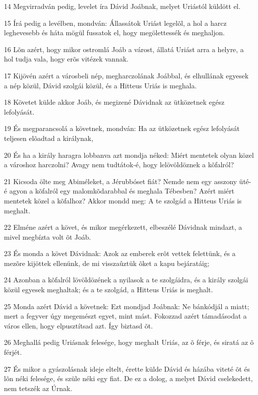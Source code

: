 \par 14 Megvirradván pedig, levelet íra Dávid Joábnak, melyet Uriástól küldött el.
\par 15 Írá pedig a levélben, mondván: Állassátok Uriást legelõl, a hol a harcz leghevesebb és háta mögül fussatok el, hogy megölettessék és meghaljon.
\par 16 Lõn azért, hogy mikor ostromlá Joáb a várost, állatá Uriást arra a helyre, a hol tudja vala, hogy erõs vitézek vannak.
\par 17 Kijövén azért a városbeli nép, megharczolának Joábbal, és elhullának egyesek a nép közül, Dávid szolgái közül, és a Hitteus Uriás is meghala.
\par 18 Követet külde akkor Joáb, és megizené Dávidnak az ütközetnek egész lefolyását.
\par 19 És megparancsolá a követnek, mondván: Ha az ütközetnek egész lefolyását teljesen elõadtad a királynak,
\par 20 És ha a király haragra lobbanva azt mondja néked: Miért mentetek olyan közel a városhoz harczolni? Avagy nem tudtátok-é, hogy lelövöldöznek a kõfalról?
\par 21 Kicsoda ölte meg Abiméleket, a Jérubbóset fiát? Nemde nem egy asszony üté-é agyon a kõfalról egy malomkõdarabbal és meghala Tébesben? Azért miért mentetek közel a kõfalhoz? Akkor mondd meg: A te szolgád a Hitteus Uriás is meghalt.
\par 22 Elméne azért a követ, és mikor megérkezett, elbeszélé Dávidnak mindazt, a mivel megbízta volt õt Joáb.
\par 23 És monda a követ Dávidnak: Azok az emberek erõt vettek felettünk, és a mezõre kijöttek ellenünk, de mi visszaûztük õket a kapu bejáratáig;
\par 24 Azonban a kõfalról lövöldözének a nyilasok a te szolgáidra, és a király szolgái közül egyesek meghaltak; és a te szolgád, a Hitteus Uriás is meghalt.
\par 25 Monda azért Dávid a követnek: Ezt mondjad Joábnak: Ne bánkódjál a miatt; mert a fegyver úgy megemészt egyet, mint mást. Fokozzad azért támadásodat a város ellen, hogy elpusztítsad azt. Így biztasd õt.
\par 26 Meghallá pedig Uriásnak felesége, hogy meghalt Uriás, az õ férje, és siratá az õ férjét.
\par 27 És mikor a gyászolásnak ideje eltelt, érette külde Dávid és házába viteté õt és lõn néki felesége, és szüle néki egy fiat. De ez a dolog, a melyet Dávid cselekedett,  nem tetszék az Úrnak.

